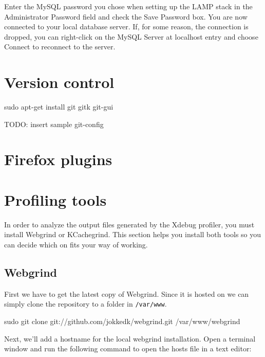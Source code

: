\documentclass[ebook,10pt,twoside,openright]{memoir}
\begin{document}
Enter the MySQL password you chose when setting up the LAMP stack in the Administrator Password field and check the Save Password box. You are now connected to your local database server. If, for some reason, the connection is dropped, you can right-click on the MySQL Server at localhost entry and choose Connect to reconnect to the server.

\section{Version control}

\begin{squashboxcommand}
sudo apt-get install git gitk git-gui
\end{squashboxcommand}

TODO: insert sample git-config

\section{Firefox plugins}


\section{Profiling tools}

In order to analyze the output files generated by the Xdebug profiler, you must install Webgrind or KCachegrind. This section helps you install both tools so you can decide which on fits your way of working.

\subsection{Webgrind}

First we have to get the latest copy of Webgrind. Since it is hosted on  we can simply clone the repository to a folder in \verb!/var/www!.

\begin{squashboxcommand}
sudo git clone git://github.com/jokkedk/webgrind.git /var/www/webgrind
\end{squashboxcommand}

Next, we’ll add a hostname for the local webgrind installation. Open a terminal window and run the following command to open the hosts file in a text editor:
\end{document}
